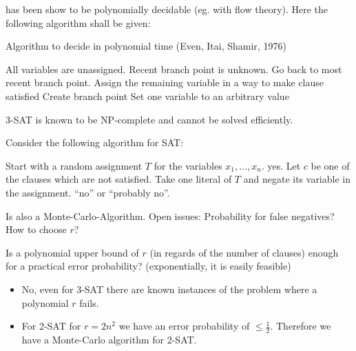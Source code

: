 \documentclass[a4paper]{article}
\newcommand{\cls}[1]{\rm{#1}}
\newcommand{\probl}[1]{\text{\textsc{#1}}}
\begin{document}
\probl{2-SAT} has been show to be polynomially decidable (eg. with flow theory).
Here the following algorithm shall be given:
\begin{algorithm}
  \caption{Algorithm to decide \probl{2-SAT} in polynomial time (Even, Itai, Shamir, 1976)}
\begin{algorithmic}[1]
  \State All variables are unassigned. Recent branch point is unknown.
        \State {}
      \Else
        \State Go back to most recent branch point.
      \EndIf
      \State Assign the remaining variable in a way to make clause satisfied
      \State Create branch point
      \State Set one variable to an arbitrary value
    \EndIf
  \EndWhile
\end{algorithmic}
\end{algorithm}
%

3-SAT is known to be \cls{NP}-complete and cannot be solved efficiently.

Consider the following algorithm for SAT:
\begin{algorithm}
\begin{algorithmic}[1]
  \State Start with a random assignment $T$ for the variables $x_1, \ldots, x_n$.
      \State \Return yes.
    \EndIf
    \State Let $c$ be one of the clauses which are not satisfied.
    \State Take one literal of $T$ and negate its variable in the assignment.
  \EndFor
  \State \Return ``no'' or ``probably no''.
\end{algorithmic}
\end{algorithm}

Is also a Monte-Carlo-Algorithm.
Open issues: Probability for false negatives? How to choose $r$?

Is a polynomial upper bound of $r$ (in regards of the number of clauses) enough
for a practical error probability? (exponentially, it is easily feasible)

\begin{itemize}
  \item No, even for 3-SAT there are known instances of the problem where a polynomial $r$ fails.
  \item For 2-SAT for $r = 2n^2$ we have an error probability of $\leq \frac12$.
        Therefore we have a Monte-Carlo algorithm for 2-SAT.
\end{itemize}
\end{document}
